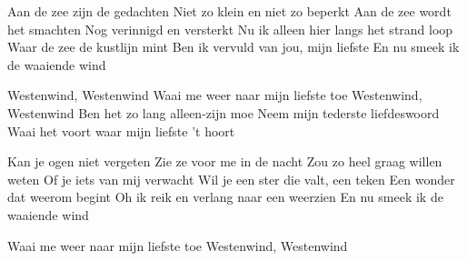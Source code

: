 \medskip

\begin{guitar}
  Aan de zee zijn de gedachten
  Niet zo klein en niet zo beperkt
  Aan de zee wordt het smachten
  Nog verinnigd en versterkt
  Nu ik alleen hier langs het strand loop
  Waar de zee de kustlijn mint
  Ben ik vervuld van jou, mijn liefste
  En nu smeek ik de waaiende wind
  \smallskip

  Westenwind, Westenwind
  Waai me weer naar mijn liefste toe
  Westenwind, Westenwind
  Ben het zo lang alleen-zijn moe
  Neem mijn tederste liefdeswoord
  Waai het voort waar mijn liefste 't hoort

  Kan je ogen niet vergeten
  Zie ze voor me in de nacht
  Zou zo heel graag willen weten
  Of je iets van mij verwacht
  Wil je een ster die valt, een teken
  Een wonder dat weerom begint
  Oh ik reik en verlang naar een weerzien
  En nu smeek ik de waaiende wind
  \smallskip

   
  Waai me weer naar mijn liefste toe
  Westenwind, Westenwind
\end{guitar}

